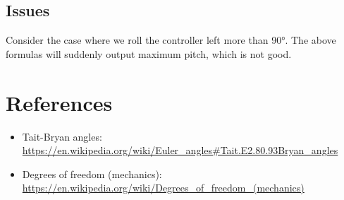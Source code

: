 \documentclass[12pt]{article}
\begin{document}
	\subsection{Issues}
	
	Consider the case where we roll the controller left more than 90$\si{\degree}$. 
	The above formulas will suddenly output maximum pitch, which is not good.
		
	
	
	
	\section{References}

	
	\begin{itemize}
		\item Tait-Bryan angles: \url{https://en.wikipedia.org/wiki/Euler_angles#Tait.E2.80.93Bryan_angles}	
		\item Degrees of freedom (mechanics): \url{https://en.wikipedia.org/wiki/Degrees_of_freedom_(mechanics)}
	\end{itemize}
\end{document}
